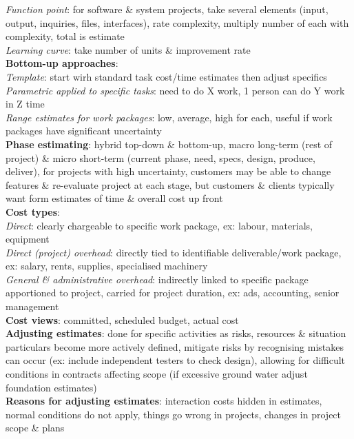 \documentclass[a4paper]{article}
\begin{document}
\begin{multicols}{3}
        \textit{Function point}: for software \& system projects, take several elements (input, output, inquiries, files, interfaces), rate complexity, multiply number of each with complexity, total is estimate\\
        \textit{Learning curve}: take number of units \& improvement rate\\
        \textbf{Bottom-up approaches}:\\
        \textit{Template}: start wirh standard task cost/time estimates then adjust specifics\\
        \textit{Parametric applied to specific tasks}: need to do X work, 1 person can do Y work in Z time\\
        \textit{Range estimates for work packages}: low, average, high for each, useful if work packages have significant uncertainty\\
        \textbf{Phase estimating}: hybrid top-down \& bottom-up, macro long-term (rest of project) \& micro short-term (current phase, need, specs, design, produce, deliver), for projects with high uncertainty, customers may be able to change features \& re-evaluate project at each stage, but customers \& clients typically want form estimates of time \& overall cost up front\\
        \textbf{Cost types}:\\
        \textit{Direct}: clearly chargeable to specific work package, ex: labour, materials, equipment\\
        \textit{Direct (project) overhead}: directly tied to identifiable deliverable/work package, ex: salary, rents, supplies, specialised machinery\\
        \textit{General \& administrative overhead}: indirectly linked to specific package apportioned to project, carried for project duration, ex: ads, accounting, senior management\\
        \textbf{Cost views}: committed, scheduled budget, actual cost\\
        \textbf{Adjusting estimates}: done for specific activities as risks, resources \& situation particulars become more actively defined, mitigate risks by recognising mistakes can occur (ex: include independent testers to check design), allowing for difficult conditions in contracts affecting scope (if excessive ground water adjust foundation estimates)\\
        \textbf{Reasons for adjusting estimates}: interaction costs hidden in estimates, normal conditions do not apply, things go wrong in projects, changes in project scope \& plans\\

\end{multicols}
\end{document}
